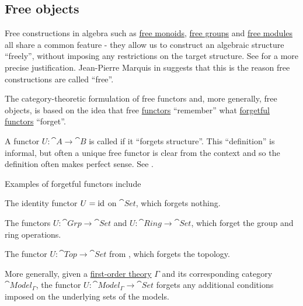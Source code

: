 \subsection{Free objects}\label{subsec:free_objects}

\begin{remark}\label{rem:free_construction_etymology}
  Free constructions in algebra such as \hyperref[def:free_monoid]{free monoids}, \hyperref[def:free_group]{free groups} and \hyperref[def:free_left_module]{free modules} all share a common feature - they allow us to construct an algebraic structure \enquote{freely}, without imposing any restrictions on the target structure. See  for a more precise justification. Jean-Pierre Marquis in \cite{StanfordPlato:category_theory} suggests that this is the reason free constructions are called \enquote{free}.

  The category-theoretic formulation of free functors and, more generally, free objects, is based on the idea that free \hyperref[def:free_functor]{functors} \enquote{remember} what \hyperref[def:forgetful_functor]{forgetful functors} \enquote{forget}.
\end{remark}

\begin{definition}\label{def:forgetful_functor}\mcite\cite[exmpl. 1.2.3]{Leinster2016Basic}
  A functor \( U: \cat{A} \to \cat{B} \) is called  if it \enquote{forgets structure}. This \enquote{definition} is informal, but often a unique free functor is clear from the context and so the definition often makes perfect sense. See .
\end{definition}

\begin{example}\label{ex:forgetful_functors}
  Examples of forgetful functors include

  \begin{thmenum}
    \item The identity functor \( U = \operatorname{id} \) on \( \cat{Set} \), which forgets nothing.
    \item The functors \( U: \cat{Grp} \to \cat{Set} \) and \( U: \cat{Ring} \to \cat{Set} \), which forget the group and ring operations.
    \item The functor \( U: \cat{Top} \to \cat{Set} \) from , which forgets the topology.
    \item More generally, given a \hyperref[def:first_order_theory]{first-order theory} \( \Gamma \) and its corresponding category \( \cat{Model}_\Gamma \), the functor \( U: \cat{Model}_\Gamma \to \cat{Set} \) forgets any additional conditions imposed on the underlying sets of the models.
  \end{thmenum}
\end{example}

